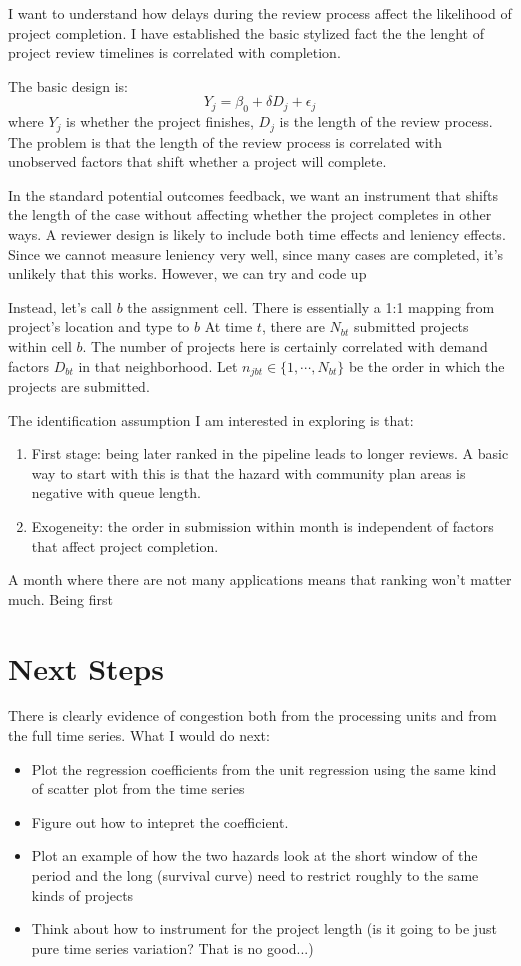 \documentclass[12pt]{article}
\theoremstyle{definition}
\begin{document}
I want to understand how delays during the review process affect the likelihood of project completion. I have established the basic stylized fact the the lenght of project review timelines is correlated with completion. 

The basic design is:
$$Y_j = \beta_0 + \delta D_j + \epsilon_j$$
where $Y_j$ is whether the project finishes, $D_j$ is the length of the review process. The problem is that the length of the review process is correlated with unobserved factors that shift whether a project will complete. 

In the standard potential outcomes feedback, we want an instrument that shifts the length of the case without affecting whether the project completes in other ways. A reviewer design is likely to include both time effects and leniency effects. Since we cannot measure leniency very well, since many cases are completed, it's unlikely that this works. However, we can try and code up 

Instead, let's call $b$ the assignment cell. There is essentially a 1:1 mapping from project's location and type to $b$  At time $t$, there are $N_{bt}$ submitted projects within cell $b$. The number of projects here is certainly correlated with demand factors $D_{bt}$ in that neighborhood. Let $n_{jbt}\in \{1,\cdots,N_{bt}\}$ be the order in which the projects are submitted.

The identification assumption I am interested in exploring is that:
\begin{enumerate}
  \item First stage: being later ranked in the pipeline leads to longer reviews. A basic way to start with this is that the hazard with community plan areas is negative with queue length.
  \item Exogeneity: the order in submission within month is independent of factors that affect project completion.   
\end{enumerate}

A month where there are not many applications means that ranking won't matter much. Being first 





\section{Next Steps}
There is clearly evidence of congestion both from the processing units and from the full time series. What I would do next:
\begin{itemize}
  \item Plot the regression coefficients from the unit regression using the same kind of scatter plot from the time series 
  \item Figure out how to intepret the coefficient. 
  \item Plot an example of how the two hazards look at the short window of the period and the long (survival curve) need to restrict roughly to the same kinds of projects
  \item Think about how to instrument for the project length (is it going to be just pure time series variation? That is no good...)
\end{itemize}
\end{document}
